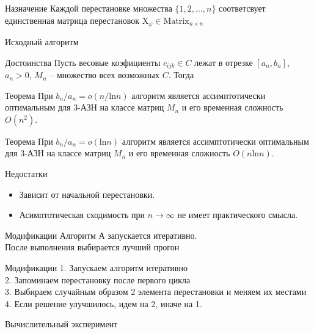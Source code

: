 \documentclass[12pt]{beamer}
\begin{document}
\begin{frame}{Назначение}
Каждой перестановке множества $\{1, 2, \ldots , n \}$ соответсвует единственная матрица
перестановок $\mathrm{X}_\varphi \in \mathrm{Matrix}_{n \times n}$
\end{frame}

\begin{frame}{Исходный алгоритм}
\end{frame}

\begin{frame}{Достоинства}
Пусть весовые коэфициенты $c_{ijk} \in C$ лежат в отрезке $[a_n, b_n]$, $a_n>0$, $M_n$ -- множество всех возможных $C$. Тогда
\begin{block}{Теорема}
При $b_n / a_n = o(n/ \mathrm{ln} n)$ алгоритм является ассимптотически оптимальным для 3-АЗН на классе матриц $M_n$
и его временная сложность  $O(n^2)$.
\end{block}
\begin{block}{Теорема}
При $b_n / a_n = o(\mathrm{ln} n)$ алгоритм является ассимптотически оптимальным для 3-АЗН на классе матриц $M_n$
и его временная сложность  $O(n \mathrm{ln} n)$. 
\end{block}
\end{frame}

\begin{frame}{Недостатки}
\begin{itemize}
\item Зависит от начальной перестановки.
\item Асимптотическая сходимость при $n \rightarrow \infty$ не имеет практического смысла. 
\end{itemize}
\end{frame}

\begin{frame}{Модификации}
Алгоритм А запускается итеративно. \\
После выполнения выбирается лучший прогон
\end{frame}

\begin{frame}{Модификации}
1. Запускаем алгоритм итеративно \\
2. Запоминаем перестановку после первого цикла \\ 
3. Выбираем случайным образом 2 элемента перестановки и меняем их местами
4. Если решение улучшилось, идем на 2, иначе на 1.
\end{frame}

\begin{frame}{Вычислительный эксперимент}

\end{frame}
\end{document}

